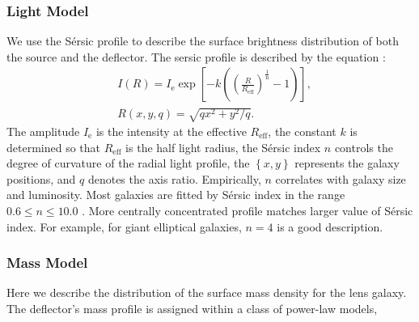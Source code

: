 \documentclass[a4paper,11pt]{article}
\begin{document}
\subsubsection{Light Model}

We use the S\'ersic profile
\cite{1963BAAA....6...41S,1968adga.book.....S} to describe the surface
brightness distribution of both the source and the deflector. The
sersic profile is described by the equation \cite{1993MNRAS.265.1013C}:
%
\begin{eqnarray}
   \label{eq:Intensity}
   &I(R) = I_{\mathrm{e}} \exp\left[-k\left(\left(\frac{R}{R_{\mathrm{eff}}}\right)^{\frac{1}{\mathrm{n}}}-1\right)\right] ,\\
   &R(x,y,q) = \sqrt{qx^2+y^2/q}.
\end{eqnarray}
%
The amplitude $I_{\mathrm{e}}$ is the intensity at the effective
$R_{\mathrm{eff}}$, the constant $k$ is determined so that
$R_{\mathrm{eff}}$ is the half light radius, the S\'ersic index $n$
controls the degree of curvature of the radial light profile, the
$\left\{x,y\right\}$ represents the galaxy positions, and $q$ denotes
the axis ratio. Empirically, $n$ correlates with galaxy size and
luminosity. Most galaxies are fitted by S\'ersic index in the range
$0.6 \le n \le 10.0$ \cite{2006AJ....132.2685M}. More centrally
concentrated profile matches larger value of S\'ersic index. For
example, for giant elliptical galaxies, $n = 4$ is a good description.


\subsubsection{Mass Model}

Here we describe the distribution of the surface mass density for the lens galaxy. The deflector's mass profile is assigned within a class of power-law models,
\end{document}
